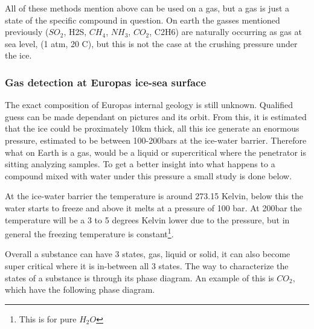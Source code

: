 All of these methods mention above can be used on a gas, but a gas is just a state of the specific compound in question. On earth the gasses mentioned previously ($SO_2$, H2S, $CH_4$, $NH_3$, $CO_2$, C2H6) are naturally occurring as gas at sea level, (1 atm, 20 C), but this is not the case at the crushing pressure under the ice.

\subsubsection{Gas detection at Europas ice-sea surface}

The exact composition of Europas internal geology is still unknown. Qualified guess can be made dependant on pictures and its orbit. From this, it is estimated that the ice could be proximately 10km thick, all this ice generate an enormous pressure, estimated to be between 100-200bars at the ice-water barrier. Therefore what on Earth is a gas, would be a liquid or supercritical where the penetrator is sitting analyzing samples. To get a better insight into what happens to a compound mixed with water under this pressure a small study is done below.

At the ice-water barrier the temperature is around 273.15 Kelvin, below this the water starts to freeze and above it melts at a pressure of 100 bar\cite{PhaseH20}. At 200bar the temperature will be a 3 to 5 degrees Kelvin lower due to the pressure, but in general the freezing temperature is constant\footnote{This is for pure $H_2 O$}.

Overall a substance can have 3 states, gas, liquid or solid, it can also become super critical where it is in-between all 3 states. The way to characterize the states of a substance is through its phase diagram. An example of this is $CO_2$, which have the following phase diagram.

